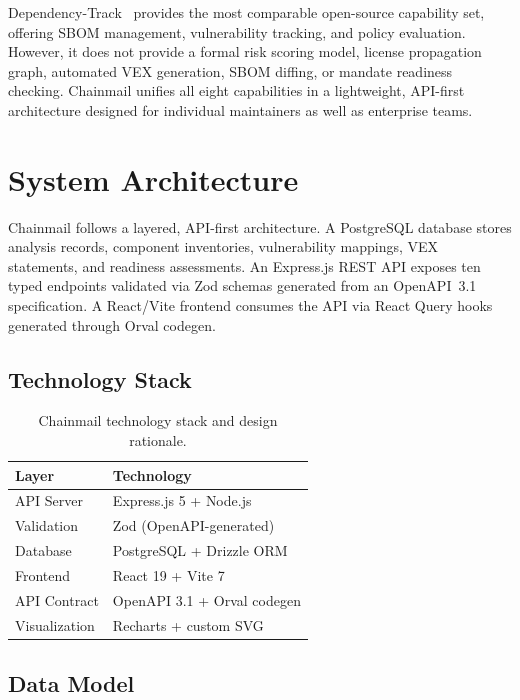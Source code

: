 \documentclass[11pt,twocolumn]{article}
\begin{document}
Dependency-Track~\cite{deptrack} provides the most comparable open-source
capability set, offering SBOM management, vulnerability tracking, and policy
evaluation. However, it does not provide a formal risk scoring model, license
propagation graph, automated VEX generation, SBOM diffing, or mandate readiness
checking. Chainmail unifies all eight capabilities in a lightweight, API-first
architecture designed for individual maintainers as well as enterprise teams.

\section{System Architecture}

Chainmail follows a layered, API-first architecture. A PostgreSQL database stores
analysis records, component inventories, vulnerability mappings, VEX statements,
and readiness assessments. An Express.js REST API exposes ten typed endpoints
validated via Zod schemas generated from an OpenAPI~3.1 specification. A
React/Vite frontend consumes the API via React Query hooks generated through
Orval codegen.

\subsection{Technology Stack}

\begin{table}[h]
\centering
\small
\caption{Chainmail technology stack and design rationale.}
\begin{tabularx}{\columnwidth}{lX}
\toprule
\textbf{Layer} & \textbf{Technology} \\
\midrule
API Server  & Express.js 5 + Node.js \\
Validation  & Zod (OpenAPI-generated) \\
Database    & PostgreSQL + Drizzle ORM \\
Frontend    & React 19 + Vite 7 \\
API Contract & OpenAPI 3.1 + Orval codegen \\
Visualization & Recharts + custom SVG \\
\bottomrule
\end{tabularx}
\end{table}

\subsection{Data Model}
\end{document}
